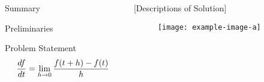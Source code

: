 \documentclass[final]{beamer}
\title{} %
\author{$^1$ (), $^1$, and $^2$}
\institute{
    $^1$University of California, Santa Cruz; %
    $^2$University of California, Santa Barbara%
    } %
\newlength{\colspace}
\newlength{\colspaceinner}
\newlength{\colspaceouter}
\newlength{\onecolwid}
\begin{document}

\setlength{\belowcaptionskip}{2ex} %
\setlength\belowdisplayshortskip{2ex} %

\begin{frame}[t] %

\begin{columns}[t] %

\hspace{\colspaceouter} %
\begin{column}{\onecolwid} %


\begin{block}{Summary}
    \lipsum[1]
\end{block}


\begin{block}{Preliminaries}
    \lipsum[2]
\end{block}

\begin{block}{Problem Statement}
    \lipsum[2][1-2]
    $$ \ddt[f]=\lim_{h \to 0} \frac{f(t+h)-f(t)}{h} $$
    \lipsum[3-5]
\end{block}

\end{column} %
\hspace{\colspaceinner}
\begin{column}{\onecolwid}%

\begin{block}{[Descriptions of Solution]}
    \lipsum[6-8]
    \begin{figure}[ht]
        \centering
        \texttt{[image: example-image-a]}
    \end{figure}
    \lipsum[9][1-3]
\end{block}


\end{column}
\end{columns}
\end{frame}
\end{document}
